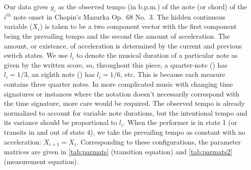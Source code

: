 \documentclass[aoas]{imsart}
\begin{document}
Our data gives $y_i$ as the observed tempo (in b.p.m.) of the note (or
chord) of the $i^{th}$ note onset in Chopin's Mazurka Op.\ 68 No.\ 3. The
hidden continuous variable ($X_i$) is 
taken to be a two component vector with the first component being the
prevailing tempo and the second the amount of acceleration. The amount, or
existence, of acceleration is determined by the current and previous
switch states. We use $l_i$ to denote the musical duration of
a particular note as given by the written score, so, throughout this piece, a quarter-note (\quarternote) has $l_i=1/3$, an
eighth note (\eighthnote) has $l_i=1/6$, etc. This is because each
measure contains three quarter notes. In more complicated
music with changing time signatures or instances where the notation
doesn't necessarily correspond with the time signature, more care
would be required. The observed tempo is already normalized to account
for variable note durations, but the intentional tempo and its
variance should be proportional to $l_i$. When the performer is in state 1 (or
transits in and out of state 4), we take the prevailing tempo as
constant with no acceleration: $X_{i+1} = X_i$. 
Corresponding to these configurations, the parameter
matrices are given in \autoref{tab:parmats} (transition equation) and
\autoref{tab:parmats2} (measurement equation).
\end{document}
